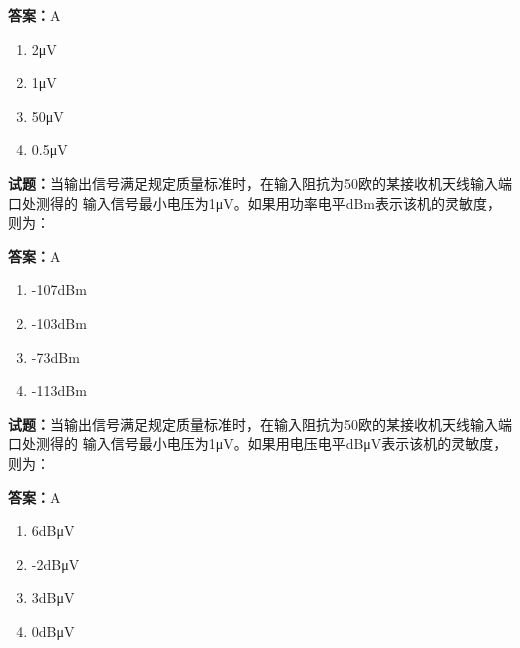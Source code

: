 \documentclass{ctexbook}
\begin{document}
\textbf{答案：}A 

\begin{enumerate}[leftmargin=3em]
  \item 2μV 

  \item 1μV 


  \item 50μV 

  \item 0.5μV 

\end{enumerate}





\vspace{1em}

\textbf{试题：}当输出信号满足规定质量标准时，在输入阻抗为50欧的某接收机天线输入端口处测得的
输入信号最小电压为1μV。如果用功率电平dBm表示该机的灵敏度，则为： 

\textbf{答案：}A 

\begin{enumerate}[leftmargin=3em]
  \item -107dBm 

  \item -103dBm 

  \item -73dBm 

  \item -113dBm 

\end{enumerate}





\vspace{1em}

\textbf{试题：}当输出信号满足规定质量标准时，在输入阻抗为50欧的某接收机天线输入端口处测得的
输入信号最小电压为1μV。如果用电压电平dBμV表示该机的灵敏度，则为： 

\textbf{答案：}A 

\begin{enumerate}[leftmargin=3em]
  \item 6dBμV 

  \item -2dBμV 

  \item 3dBμV 

  \item 0dBμV 

\end{enumerate}
\end{document}
